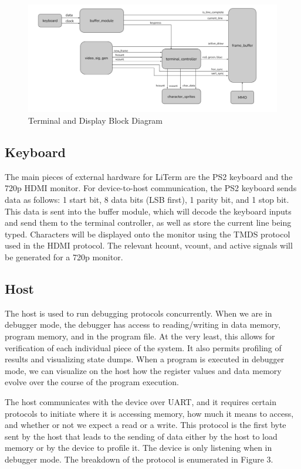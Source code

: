 \documentclass[conference]{IEEEtran}
\begin{document}
\begin{figure}
    \centering
    \includegraphics[width=1\linewidth]{terminal_conroller.png}
    \caption{Terminal and Display Block Diagram}
    \label{fig:enter-label}
\end{figure}

\subsection{Keyboard}
The main pieces of external hardware for LiTerm are the PS2 keyboard and the 720p HDMI monitor. For device-to-host communication, the PS2 keyboard sends data as follows: 1 start bit, 8 data bits (LSB first), 1 parity bit, and 1 stop bit. This data is sent into the buffer module, which will decode the keyboard inputs and send them to the terminal controller, as well as store the current line being typed. Characters will be displayed onto the monitor using the TMDS protocol used in the HDMI protocol. The relevant hcount, vcount, and active signals will be generated for a 720p monitor.


\subsection{Host}
The host is used to run debugging protocols concurrently. When we are in debugger mode, the debugger has access to reading/writing in data memory, program memory, and in the program file. At the very least, this allows for verification of each individual piece of the system. It also permits profiling of results and visualizing state dumps. When a program is executed in debugger mode, we can visualize on the host how the register values and data memory evolve over the course of the program execution. 

The host communicates with the device over UART, and it requires certain protocols to initiate where it is accessing memory, how much it means to access, and whether or not we expect a read or a write. This protocol is the first byte sent by the host that leads to the sending of data either by the host to load memory or by the device to profile it. The device is only listening when in debugger mode. The breakdown of the protocol is enumerated in Figure 3.
\end{document}
